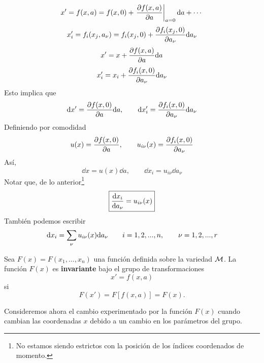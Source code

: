 \begin{equation}
  x'=f(x,a)=f(x,0)+\eval{\pdv{f(x,a)}{a}}_{a=0}\dd a+\cdots
\end{equation}
\begin{equation}
  x'_i=f_i(x_j,a_\nu )=f_i(x_j,0)+\pdv{f_i(x_j,0)}{a_\nu }\dd a_\nu
\end{equation}
\begin{equation}
  x'=x+\pdv{f(x,a)}{a}\dd a
\end{equation}
\begin{equation}
  x'_i=x_i+\pdv{f_i(x,0)}{a_\nu}\dd a_\nu
\end{equation}
Esto implica que
\begin{equation}
  \dd x'=\pdv{f(x,0)}{a}\dd a,\qquad \dd x'_i=\pdv{f_i(x,0)}{a_\nu}\dd a_\nu
\end{equation}
Definiendo por comodidad
\begin{equation}
  u(x)=\pdv{f(x,0)}{a},\qquad u_{i\nu}(x)=\pdv{f_i(x,0)}{a_\nu}
\end{equation}
Así,
\begin{equation}\label{8.dxuda}
  \dd x=u(x)\dd a,\qquad \dd x_i=u_{i\nu}\dd a_\nu
\end{equation}
Notar que, de lo anterior\footnote{No estamos siendo estrictos con la posición de los índices coordenados de momento.}
\begin{equation}
 \boxed{ \dv{x_i}{a_\nu}=u_{i\nu}(x)}
\end{equation}
También podemos escribir
\begin{equation}
  \dd x_i=\sum _\nu u_{i\nu }(x)\dd a_\nu \qquad i=1,2,...,n,\qquad \nu =1,2,...,r
\end{equation}

\begin{defi}
	Sea $F(x)=F(x_1,...,x_n)$ una función definida sobre la variedad $\mathcal{M}$. La función $F(x)$ es \textbf{invariante} bajo el grupo de transformaciones \begin{equation}
  x'=f(x,a)
\end{equation}
si $$F(x')=F[f(x,a)]=F(x).$$
\end{defi}

Consideremos ahora el cambio experimentado por la función $F(x)$ cuando cambian las coordenadas $x$ debido a un cambio en los parámetros del grupo.

